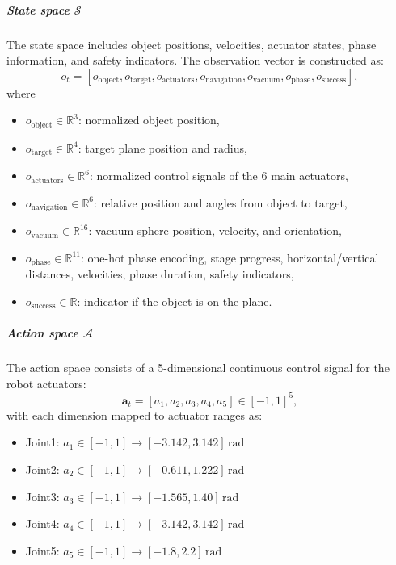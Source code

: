 \documentclass[english, 12pt, a4paper, elec, utf8, a-2b, online]{aaltothesis}
\begin{document}
\subparagraph{State space $\mathcal{S}$}
The state space includes object positions, velocities, actuator states, phase information, and safety indicators. The observation vector is constructed as:
\begin{equation}
o_t = [o_\text{object}, o_\text{target}, o_\text{actuators}, o_\text{navigation}, o_\text{vacuum}, o_\text{phase}, o_\text{success}],
\end{equation}
where
\begin{itemize}
    \item $o_\text{object} \in \mathbb{R}^3$: normalized object position,
    \item $o_\text{target} \in \mathbb{R}^4$: target plane position and radius,
    \item $o_\text{actuators} \in \mathbb{R}^6$: normalized control signals of the 6 main actuators,
    \item $o_\text{navigation} \in \mathbb{R}^6$: relative position and angles from object to target,
    \item $o_\text{vacuum} \in \mathbb{R}^{16}$: vacuum sphere position, velocity, and orientation,
    \item $o_\text{phase} \in \mathbb{R}^{11}$: one-hot phase encoding, stage progress, horizontal/vertical distances, velocities, phase duration, safety indicators,
    \item $o_\text{success} \in \mathbb{R}$: indicator if the object is on the plane.
\end{itemize}

\subparagraph{Action space $\mathcal{A}$}
The action space consists of a 5-dimensional continuous control signal for the robot actuators:
\begin{equation}
\mathbf{a}_t = [a_1, a_2, a_3, a_4, a_5] \in [-1,1]^5,
\end{equation}
with each dimension mapped to actuator ranges as:
\begin{itemize}
    \item Joint1: $a_1 \in [-1,1] \rightarrow [-3.142, 3.142]\,\text{rad}$
    \item Joint2: $a_2 \in [-1,1] \rightarrow [-0.611, 1.222]\,\text{rad}$
    \item Joint3: $a_3 \in [-1,1] \rightarrow [-1.565, 1.40]\,\text{rad}$
    \item Joint4: $a_4 \in [-1,1] \rightarrow [-3.142, 3.142]\,\text{rad}$
    \item Joint5: $a_5 \in [-1,1] \rightarrow [-1.8, 2.2]\,\text{rad}$
\end{itemize}
\end{document}
